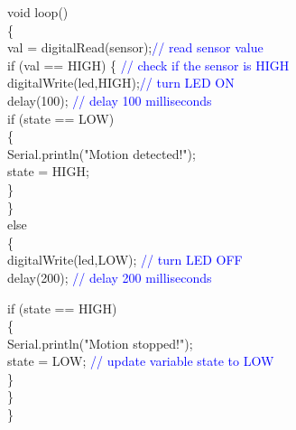 \documentclass[12pt,a4paper]{article}
\begin{document}
void loop()\\
\{\\
  val = digitalRead(sensor);\textcolor{blue}{// read sensor value}\\
  if (val == HIGH) \{ \textcolor{blue}{ // check if the sensor is HIGH}\\
    digitalWrite(led,HIGH);\textcolor{blue}{// turn LED ON}\\
    delay(100);  \textcolor{blue}{// delay 100 milliseconds }\\
    
     if (state == LOW) \\
     \{\\
         Serial.println("Motion detected!"); \\
         state = HIGH; \textcolor{blue}\\
         \}\\
    \}\\ 
  else \\
  \{\\
       digitalWrite(led,LOW);\textcolor{blue}{ // turn LED OFF}\\
       delay(200); \textcolor{blue}{// delay 200 milliseconds}
      
         if (state == HIGH)\\
         \{\\
         Serial.println("Motion stopped!");\\
        state = LOW;  \textcolor{blue}{// update variable state to LOW}\\
          \}\\
      \}\\
  \}\\
\end{document}
